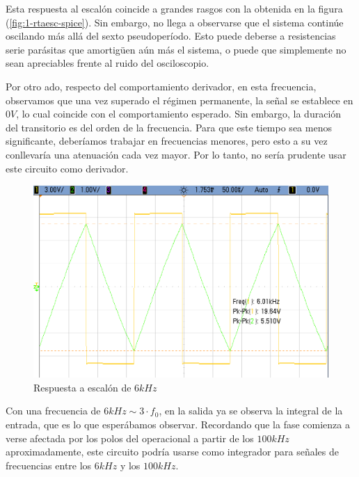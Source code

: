\documentclass[../../tc_tp3_main.tex]{subfiles}
\begin{document}
Esta respuesta al escal\'on coincide a grandes rasgos con la obtenida en la figura (\ref{fig:1-rtaesc-spice}). Sin embargo, no llega a observarse que el sistema contin\'ue oscilando m\'as all\'a del sexto pseudoper\'iodo. Esto puede deberse a resistencias serie par\'asitas que amortig\"uen a\'un m\'as el sistema, o puede que simplemente no sean apreciables frente al ruido del osciloscopio.\par

Por otro ado, respecto del comportamiento derivador, en esta frecuencia, observamos que una vez superado el r\'egimen permanente, la se\~nal se establece en $0V$, lo cual coincide con el comportamiento esperado. Sin embargo, la duraci\'on del transitorio es del orden de la frecuencia. Para que este tiempo sea menos significante, deber\'iamos trabajar en frecuencias menores, pero esto a su vez conllevar\'ia una atenuaci\'on cada vez mayor. Por lo tanto, no ser\'ia prudente usar este circuito como derivador.

\begin{figure}[H]
	\centering
  	\includegraphics[scale = 0.32]{imagenes/tc_tp3_ej1_6kHz.png}
  	\caption{Respuesta a escal\'on de $6kHz$}
  	\label{fig:1-rtaesc-6kHz}
\end{figure}

Con una frecuencia de $6kHz \sim 3\cdot f_0$, en la salida ya se observa la integral de la entrada, que es lo que esper\'abamos observar. Recordando que la fase comienza a  verse afectada por los polos del operacional a partir de los $100kHz$ aproximadamente, este circuito podr\'ia usarse como integrador para se\~nales de frecuencias entre los $6kHz$ y los $100kHz$.
\end{document}
